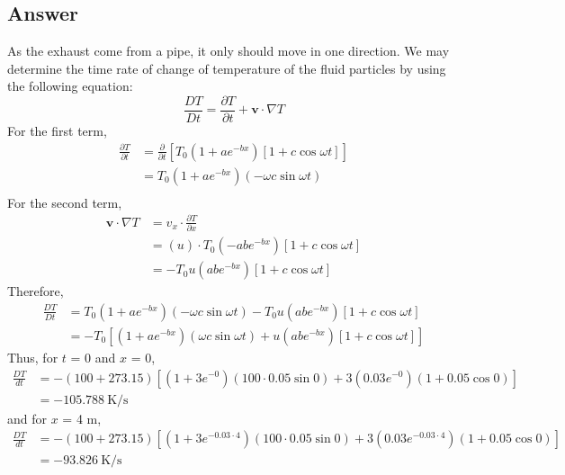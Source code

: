 \documentclass{article}
\begin{document}
\subsection*{Answer}
As the exhaust come from a pipe, it only should move in one direction. We may determine the time rate of change of temperature of the fluid particles by using the following equation:
\begin{equation}
    \frac{DT}{Dt} = \frac{\partial T}{\partial t} + \mathbf{v} \cdot \nabla T
\end{equation}
For the first term,
\begin{align*}
    \frac{\partial T}{\partial t} &= \frac{\partial}{\partial t} \left[T_0 \left(1 + ae^{-bx}\right)\left[1 + c \cos{\omega t}\right]\right] \\
    &= T_0 \left(1 + ae^{-bx}\right)\left(-\omega c \sin{\omega t}\right) \\
\end{align*}
For the second term,
\begin{align*}
    \mathbf{v} \cdot \nabla T &= v_x \cdot \frac{\partial T}{\partial x} \\
    &= (u) \cdot T_0 \left(-abe^{-bx} \right)\left[1 + c \cos{\omega t}\right] \\
    &= -T_0 u \left(abe^{-bx} \right)\left[1 + c \cos{\omega t}\right]
\end{align*}
Therefore,
\begin{align*}
    \frac{DT}{Dt} &= T_0 \left(1 + ae^{-bx}\right)\left(-\omega c \sin{\omega t}\right) - T_0 u \left(abe^{-bx} \right)\left[1 + c \cos{\omega t}\right] \\
    &= -T_0 \left[\left(1 + ae^{-bx}\right)\left(\omega c \sin{\omega t}\right) + u \left(abe^{-bx} \right)\left[1 + c \cos{\omega t}\right]\right]
\end{align*}
Thus, for $t$ = 0 and $x$ = 0,
\begin{align*}
    \frac{DT}{dt} &= -(100 + 273.15) [(1 + 3e^{-0}) (100 \cdot 0.05 \sin{0}) + 3 \left(0.03e^{-0} \right) \left(1 + 0.05 \cos{0}\right)] \\
    &= -105.788\ \textrm{K/s}
\end{align*}
and for $x$ = 4 m,
\begin{align*}
    \frac{DT}{dt} &= -(100 + 273.15) [(1 + 3e^{-0.03 \cdot 4}) (100 \cdot 0.05 \sin{0}) + 3 \left(0.03e^{-0.03 \cdot 4} \right) \left(1 + 0.05 \cos{0}\right)] \\
    &= -93.826\ \textrm{K/s}
\end{align*}
\end{document}
